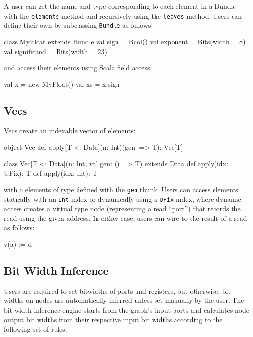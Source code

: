 \documentclass[10pt,twocolumn]{article}
\def\code#1{{\small\tt #1}}
\begin{document}
\noindent
A user can get the name and type corresponding to each element in a
Bundle with the \code{elements} method and recursively using the
\code{leaves} method. 
Users can define their own by subclassing \code{Bundle} as follows:

\begin{scala}
class MyFloat extends Bundle {
  val sign        = Bool()
  val exponent    = Bits(width = 8)
  val significand = Bits(width = 23)
}
\end{scala}

\noindent
and access their elements using Scala field access:

\begin{scala}
val x  = new MyFloat()
val xs = x.sign
\end{scala}

\subsection{Vecs}

Vecs create an indexable vector of elements: 

\begin{scala}
object Vec {
  def apply[T <: Data](n: Int)(gen: => T): Vec[T]
}

class Vec[T <: Data](n: Int, val gen: () => T) 
    extends Data {
  def apply(idx: UFix): T
  def apply(idx: Int): T
}
\end{scala}

\noindent
with \code{n} elements of type defined with the \code{gen} thunk.
Users can access elements statically with an \code{Int} index or
dynamically using a \code{UFix} index, 
where dynamic access creates a virtual type node (representing a read
``port'') that records the read using the given address.  In either case,
users can wire to the result of a read as follows:

\begin{scala}
v(a) := d
\end{scala}


\subsection{Bit Width Inference}

Users are required to set bitwidths of ports and registers, but otherwise,
bit widths on nodes are automatically inferred unless set manually by the user.
The bit-width inference engine starts from the graph's input ports and 
calculates node output bit widths from their respective input bit widths according to the following set of rules:\\
\end{document}
